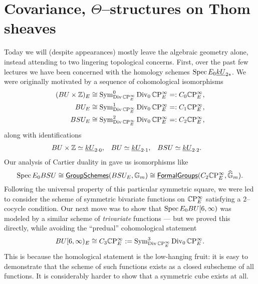 \section{Covariance, $\Theta$--structures on Thom sheaves}

Today we will (despite appearances) mostly leave the algebraic geometry alone, instead attending to two lingering topological concerns.  First, over the past few lectures we have been concerned with the homology schemes $\operatorname{Spec} E_0 \underline{\smash{kU}}_{2*}$.  We were originally motivated by a sequence of cohomological isomorphisms
\begin{align*}
(BU \times \mathbb Z)_E & \cong \operatorname{Sym}^0_{\operatorname{Div} \mathbb{C}\mathrm P^\infty_E} \operatorname{Div}_0 \mathbb{C}\mathrm P^\infty_E =: C_0 \mathbb{C}\mathrm P^\infty_E, \\
BU_E & \cong \operatorname{Sym}^1_{\operatorname{Div} \mathbb{C}\mathrm P^\infty_E} \operatorname{Div}_0 \mathbb{C}\mathrm P^\infty_E =: C_1 \mathbb{C}\mathrm P^\infty_E, \\
BSU_E & \cong \operatorname{Sym}^2_{\operatorname{Div} \mathbb{C}\mathrm P^\infty_E} \operatorname{Div}_0 \mathbb{C}\mathrm P^\infty_E =: C_2 \mathbb{C}\mathrm P^\infty_E,
\end{align*}
along with identifications
\begin{align*}
BU \times \mathbb Z & \simeq \underline{\smash{kU}}_{2 \cdot 0}, &
BU & \simeq \underline{\smash{kU}}_{2 \cdot 1}, &
BSU & \simeq \underline{\smash{kU}}_{2 \cdot 2}.
\end{align*}
Our analysis of Cartier duality in  gave us isomorphisms like \[\operatorname{Spec} E_0 BSU \cong \operatorname{\underline{\smash{\mathsf{GroupSchemes}}}}(BSU_E, \mathbb G_m) \cong \operatorname{\underline{\smash{\mathsf{FormalGroups}}}}(C_2 \mathbb{C}\mathrm P^\infty_E, \widehat{\mathbb G}_m).\] Following the universal property of this particular symmetric square, we were led to consider the scheme of symmetric bivariate functions on $\mathbb{C}\mathrm P^\infty_E$ satisfying a $2$--cocycle condition.  Our next move was to show that $\operatorname{Spec} E_0 BU[6, \infty)$ was modeled by a similar scheme of \emph{trivariate} functions --- but we proved this directly, while avoiding the ``predual'' cohomological statement \[BU[6, \infty)_E \cong C_3 \mathbb{C}\mathrm P^\infty_E := \operatorname{Sym}^3_{\operatorname{Div} \mathbb{C}\mathrm P^\infty_E} \operatorname{Div}_0 \mathbb{C}\mathrm P^\infty_E.\]  This is because the homological statement is the low-hanging fruit: it is easy to demonstrate that the scheme of such functions exists as a closed subscheme of all functions.  It is considerably harder to show that a symmetric cube exists at all.

